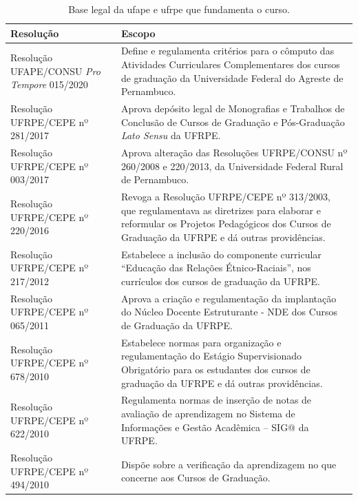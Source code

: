 \documentclass[
	12pt,				%
	openright,			%
  oneside,     %
	a4paper,			%
 hyphens,
	chapter=TITLE,		%
	english,			%
	french,				%
	spanish,			%
	brazil				%
	]{abntex2}
\begin{document}
\begin{center}
    
    \begin{scriptsize}
        \begin{longtable}{p{5.8cm}p{9cm}}
            \caption{\label{quadro:base-legal-ufrpe-curso}Base legal da \acrshort{ufape} e \acrshort{ufrpe} que fundamenta o curso.}\\
    \toprule
    \textbf{Resolução} & \textbf{Escopo} \\
    \midrule
    Resolução UFAPE/CONSU \textit{Pro Tempore} 015/2020 & Define e regulamenta critérios para o cômputo das Atividades Curriculares Complementares dos cursos de graduação da Universidade Federal do Agreste de Pernambuco. \\ \midrule
    Resolução UFRPE/CEPE nº 281/2017 & Aprova depósito legal de Monografias e Trabalhos de Conclusão de Cursos de Graduação e Pós-Graduação \textit{Lato Sensu} da UFRPE.\\ \midrule
    Resolução UFRPE/CEPE nº 003/2017 & Aprova alteração das Resoluções UFRPE/CONSU nº 260/2008 e 220/2013, da Universidade Federal Rural de Pernambuco. \\ \midrule
    Resolução UFRPE/CEPE nº 220/2016 & Revoga a Resolução UFRPE/CEPE nº 313/2003, que regulamentava as diretrizes para elaborar e reformular os Projetos Pedagógicos dos Cursos de Graduação da UFRPE e dá outras providências. \\ \midrule
    Resolução UFRPE/CEPE nº 217/2012 & Estabelece a inclusão do componente curricular ``Educação das Relações Étnico-Raciais'', nos currículos dos cursos de graduação da UFRPE. \\ \midrule
    Resolução UFRPE/CEPE nº 065/2011 & Aprova a criação e regulamentação da implantação do Núcleo Docente Estruturante - NDE dos Cursos de Graduação da UFRPE. \\ \midrule
    Resolução UFRPE/CEPE nº 678/2010 & Estabelece normas para organização e regulamentação do Estágio Supervisionado Obrigatório para os estudantes dos cursos de graduação da UFRPE e dá outras providências. \\ \midrule
    Resolução UFRPE/CEPE nº 622/2010 & Regulamenta normas de inserção de notas de avaliação de aprendizagem no Sistema de Informações e Gestão Acadêmica – SIG@ da UFRPE. \\ \midrule
    Resolução UFRPE/CEPE nº 494/2010 & Dispõe sobre a verificação da aprendizagem no que concerne aos Cursos de Graduação. \\ \midrule

\end{longtable}
\end{scriptsize}
\end{center}
\end{document}
